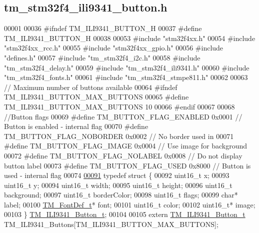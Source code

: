 \hypertarget{tm__stm32f4__ili9341__button_8h_source}{}\subsection{tm\+\_\+stm32f4\+\_\+ili9341\+\_\+button.\+h}

\begin{DoxyCode}
00001 
00036 \textcolor{preprocessor}{#ifndef TM\_ILI9341\_BUTTON\_H}
00037 \textcolor{preprocessor}{#define TM\_ILI9341\_BUTTON\_H}
00038 
00053 \textcolor{preprocessor}{#include "stm32f4xx.h"}
00054 \textcolor{preprocessor}{#include "stm32f4xx\_rcc.h"}
00055 \textcolor{preprocessor}{#include "stm32f4xx\_gpio.h"}
00056 \textcolor{preprocessor}{#include "defines.h"}
00057 \textcolor{preprocessor}{#include "tm\_stm32f4\_i2c.h"}
00058 \textcolor{preprocessor}{#include "tm\_stm32f4\_delay.h"}
00059 \textcolor{preprocessor}{#include "tm\_stm32f4\_ili9341.h"}
00060 \textcolor{preprocessor}{#include "tm\_stm32f4\_fonts.h"}
00061 \textcolor{preprocessor}{#include "tm\_stm32f4\_stmpe811.h"}
00062 
00063 \textcolor{comment}{// Maximum number of buttons available}
00064 \textcolor{preprocessor}{#ifndef TM\_ILI9341\_BUTTON\_MAX\_BUTTONS}
00065 \textcolor{preprocessor}{#define TM\_ILI9341\_BUTTON\_MAX\_BUTTONS   10}
00066 \textcolor{preprocessor}{#endif}
00067 
00068 \textcolor{comment}{//Button flags}
00069 \textcolor{preprocessor}{#define TM\_BUTTON\_FLAG\_ENABLED          0x0001  // Button is enabled - internal flag}
00070 \textcolor{preprocessor}{#define TM\_BUTTON\_FLAG\_NOBORDER         0x0002  // No border used in}
00071 \textcolor{preprocessor}{#define TM\_BUTTON\_FLAG\_IMAGE            0x0004  // Use image for background}
00072 \textcolor{preprocessor}{#define TM\_BUTTON\_FLAG\_NOLABEL          0x0008  // Do not display button label}
00073 \textcolor{preprocessor}{#define TM\_BUTTON\_FLAG\_USED             0x8000  // Button is used - internal flag}
00074 
\hypertarget{tm__stm32f4__ili9341__button_8h_source_l00091}{}\hyperlink{struct_t_m___i_l_i9341___button__t}{00091} \textcolor{keyword}{typedef} \textcolor{keyword}{struct }\{
00092     uint16\_t x;
00093     uint16\_t y;
00094     uint16\_t width;
00095     uint16\_t height;
00096     uint16\_t background;
00097     uint16\_t borderColor;
00098     uint16\_t flags;
00099     \textcolor{keywordtype}{char}* label;
00100     \hyperlink{struct_t_m___font_def__t}{TM\_FontDef\_t}* font;
00101     uint16\_t color;
00102     uint16\_t* image;
00103 \} \hyperlink{struct_t_m___i_l_i9341___button__t}{TM\_ILI9341\_Button\_t};
00104 
00105 \textcolor{keyword}{extern} \hyperlink{struct_t_m___i_l_i9341___button__t}{TM\_ILI9341\_Button\_t} TM\_ILI9341\_Buttons[TM\_ILI9341\_BUTTON\_MAX\_BUTTONS];

\end{DoxyCode}
